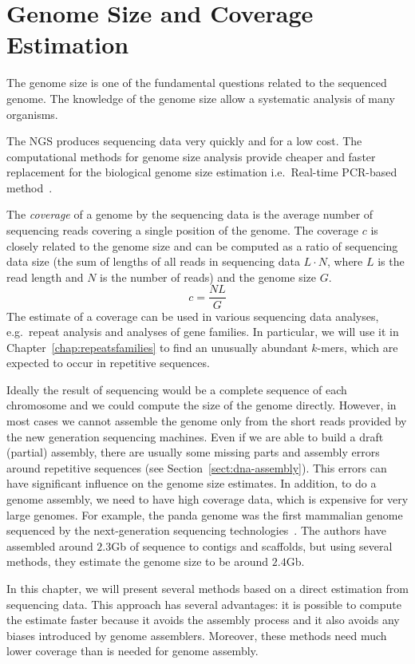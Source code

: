 \chapter[Genome Size and Coverage]{Genome Size and Coverage Estimation}
\label{chap:genomesize}

The genome size is one of the fundamental questions related to the sequenced genome. The knowledge of the genome size allow a systematic analysis of many organisms.

The NGS produces sequencing data very quickly and for a low cost.
The computational methods for genome size analysis provide cheaper and faster replacement for the biological genome size estimation i.e.\ Real-time PCR-based method~\cite{wilhelm2003real}.

The \emph{coverage} of a genome by the sequencing data is the average number of sequencing reads covering a single position of the genome. The coverage $c$ is closely related to the genome size and can be computed as a ratio of sequencing data size (the sum of lengths of all reads in sequencing data $L\cdot N$, where $L$ is the read length and $N$ is the number of reads) and the genome size $G$.
$$c = \frac{NL}{G}$$
The estimate of a coverage can be used in various sequencing data analyses, e.g.\ repeat analysis and analyses of gene families. In particular, we will use it in Chapter~\ref{chap:repeatsfamilies} to find an unusually abundant $k$-mers, which are expected to occur in repetitive sequences.

Ideally the result of sequencing would be a complete sequence of each chromosome and we could compute the size of the genome directly.
However, in most cases we cannot assemble the genome only from the short reads provided by the new generation sequencing machines.
Even if we are able to build a draft (partial) assembly, there are usually some missing parts and assembly errors around repetitive sequences (see Section~\ref{sect:dna-assembly}). This errors can have significant influence on the genome size estimates. In addition, to do a genome assembly, we need to have high coverage data, which is expensive for very large genomes. For example, the panda genome was the first mammalian genome sequenced
by the next-generation sequencing technologies~\cite{li2010panda}. The authors have assembled around $2.3$Gb of sequence to contigs and scaffolds, but using
several methods, they estimate the genome size to be around $2.4$Gb.

In this chapter, we will present several methods based on a direct estimation from sequencing data. This approach has several advantages: it is possible to compute the estimate faster because it avoids the assembly process and it also avoids any biases introduced by genome assemblers. Moreover, these methods need much lower coverage than is needed for genome assembly.


